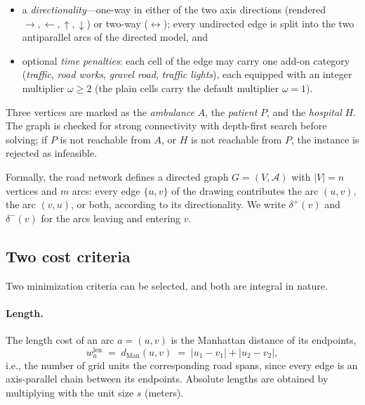 \documentclass[10pt,twocolumn]{article}
\newcommand{\dman}{d_{\mathrm{Man}}}
\begin{document}
\begin{itemize}
  \item a \emph{directionality}---one-way in either of the two axis directions
        (rendered $\rightarrow,\leftarrow,\uparrow,\downarrow$) or two-way
        ($\leftrightarrow$); every undirected edge is split into the two antiparallel arcs
        of the directed model, and
  \item optional \emph{time penalties}: each cell of the edge may carry one add-on category
        (\emph{traffic}, \emph{road works}, \emph{gravel road}, \emph{traffic lights}), each
        equipped with an integer multiplier $\omega\ge 2$ (the plain cells carry the default
        multiplier $\omega=1$).
\end{itemize}

Three vertices are marked as the \emph{ambulance} $A$, the \emph{patient} $P$, and the
\emph{hospital} $H$. The graph is checked for strong connectivity with depth-first search
before solving; if $P$ is not reachable from $A$, or $H$ is not reachable from $P$, the
instance is rejected as infeasible.

Formally, the road network defines a directed graph $G=(V,\mathcal{A})$ with $|V|=n$
vertices and $m$ arcs: every edge $\{u,v\}$ of the drawing contributes the arc $(u,v)$, the
arc $(v,u)$, or both, according to its directionality. We write
$\delta^{+}(v)$ and $\delta^{-}(v)$ for the arcs leaving and entering $v$.

\subsection{Two cost criteria}

Two minimization criteria can be selected, and both are integral in nature.

\paragraph{Length.}
The length cost of an arc $a=(u,v)$ is the Manhattan distance of its endpoints,
\[
  w^{\mathrm{len}}_a \;=\; \dman(u,v) \;=\; |u_1-v_1| + |u_2-v_2|,
\]
i.e., the number of grid units the corresponding road spans, since every edge is an
axis-parallel chain between its endpoints. Absolute lengths are obtained by multiplying
with the unit size $s$ (meters).
\end{document}
